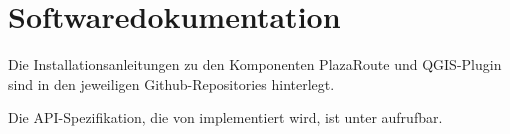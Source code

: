 \section{Softwaredokumentation}
\label{sec:Softwaredokumentation}

Die Installationsanleitungen zu den Komponenten PlazaRoute und QGIS-Plugin sind in den jeweiligen Github-Repositories \cite{github:PlazaRoute} \cite{github:PlazaRoute-qgis-plugin} hinterlegt.

Die API-Spezifikation, die von  implementiert wird, ist unter \cite{plaza-routing-api-spez} aufrufbar.